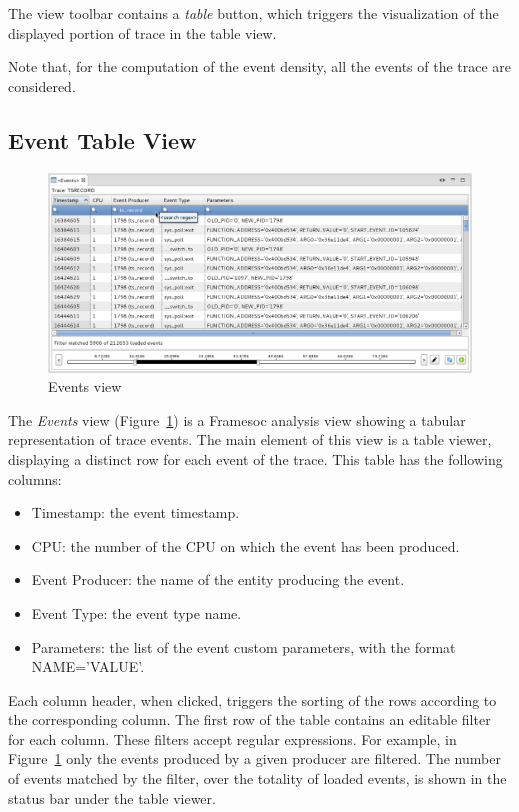 \documentclass[twoside]{article}
\begin{document}
\begin{sloppypar}
The view toolbar contains a \emph{table} button, which triggers the visualization of the displayed portion of trace in the table view.

Note that, for the computation of the event density, all the events of the trace are considered.

\subsection{Event Table View}
\label{subsec:table}

\begin{figure}[h!]
  \centering
    \includegraphics[width=1.0\textwidth]{images/table_nocategory.png}
  \caption{Events view}
  \label{fig:table_regex}
\end{figure}

The \emph{Events} view (Figure~\ref{fig:table_regex}) is a Framesoc analysis view showing a tabular representation of trace events.
The main element of this view is a table viewer, displaying a distinct row for each event of the trace.
This table has the following columns:
\begin{itemize}
 \item Timestamp: the event timestamp.
 \item CPU: the number of the CPU on which the event has been produced.
 \item Event Producer: the name of the entity producing the event.
 \item Event Type: the event type name.
 \item Parameters: the list of the event custom parameters, with the format NAME='VALUE'.
\end{itemize}
Each column header, when clicked, triggers the sorting of the rows according to the corresponding column. 
The first row of the table contains an editable filter for each column. 
These filters accept regular expressions.
For example, in Figure~\ref{fig:table_regex} only the events produced by a given producer are filtered.
The number of events matched by the filter, over the totality of loaded events, is shown in the status bar under the table viewer.


\end{sloppypar}
\end{document}
